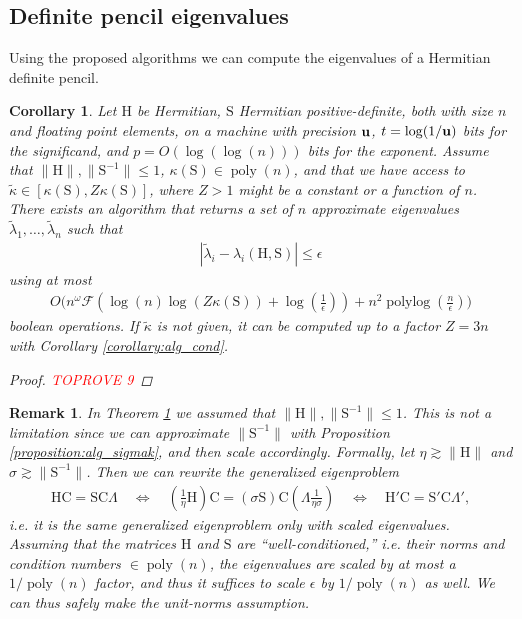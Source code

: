 \documentclass{article}
\newcommand{\labs}{\left|}
\newcommand{\rabs}{\right|}
\newtheorem{corollary}{Corollary}[section]
\newtheorem{remark}{Remark}[section]
\DeclareMathOperator{\poly}{poly}
\DeclareMathOperator{\polylog}{polylog}
\newcommand\matC{\boldsymbol{\mathrm{C}}}
\newcommand\matH{\boldsymbol{\mathrm{H}}}
\newcommand\matS{\boldsymbol{\mathrm{S}}}
\newcommand{\umach}{\textbf{\textup{u}}}
\newcommand{\flopcost}{\mathcal{F}}
\newcommand{\geneigmatrix}{\Lambda}
\begin{document}
\subsection{Definite pencil eigenvalues}
Using the proposed algorithms we can compute the eigenvalues of a Hermitian definite pencil.
\begin{corollary}
    \label{corollary:hermitian_definite_pencil_eigenvalues}
    Let $\matH$ be Hermitian, $\matS$ Hermitian positive-definite, both with size $n$ and floating point elements, on a machine with precision $\umach$, $t=\log(1/\umach)$ bits for the significand, and $p=O(\log(\log(n)))$ bits for the exponent. Assume that $\|\matH\|,\|\matS^{-1}\|\leq 1$, $\kappa(\matS)\in\poly(n)$, and that we have access to $\widetilde\kappa\in[\kappa(\matS),Z\kappa(\matS)]$, where $Z>1$ might be a constant or a function of $n$. There exists an algorithm that returns a set of $n$ approximate eigenvalues $\widetilde\lambda_1,\ldots,\widetilde\lambda_n$ such that
    \begin{align*}
        \labs \widetilde\lambda_i - \lambda_i(\matH,\matS) \rabs
        \leq
        \epsilon
    \end{align*}
    using at most 
    \begin{align*}
        O\Big(
            n^{\omega}
            \flopcost(\log(n)\log(Z\kappa(\matS)) + \log(\tfrac{1}{\epsilon}))
            +
            n^2\polylog(\tfrac{n}{\epsilon})
        \Big)
    \end{align*}
    boolean operations. If $\widetilde\kappa$ is not given, it can be computed up to a factor $Z=3n$ with Corollary \ref{corollary:alg_cond}.
    \begin{proof}\textcolor{red}{TOPROVE 9}\end{proof}
\end{corollary}
\begin{remark}
    In Theorem \ref{corollary:hermitian_definite_pencil_eigenvalues} we assumed that $\|\matH\|,\|\matS^{-1}\|\leq 1$. This is not a limitation since we can approximate $\|\matS^{-1}\|$ with Proposition \ref{proposition:alg_sigmak}, and then scale accordingly. Formally, let $\eta \gtrsim \|\matH\|$ and $\sigma\gtrsim \|\matS^{-1}\|$. Then we can rewrite the generalized eigenproblem
\begin{align*}
\matH\matC=\matS\matC\geneigmatrix
\quad
\Leftrightarrow
\quad
(\tfrac{1}{\eta}\matH)\matC = (\sigma\matS) \matC (\geneigmatrix\tfrac{1}{\eta\sigma})
\quad
\Leftrightarrow
\quad
\matH'\matC = \matS'\matC\geneigmatrix',     
\end{align*}
i.e. it is the same generalized eigenproblem only with scaled eigenvalues. Assuming that the matrices $\matH$ and $\matS$ are ``well-conditioned,'' i.e. their norms and condition numbers $\in \poly(n)$, the eigenvalues are scaled by at most a $1/\poly(n)$ factor, and thus it suffices to scale $\epsilon$ by $1/\poly(n)$ as well. We can thus safely make the unit-norms assumption. 
\end{remark}
\end{document}

